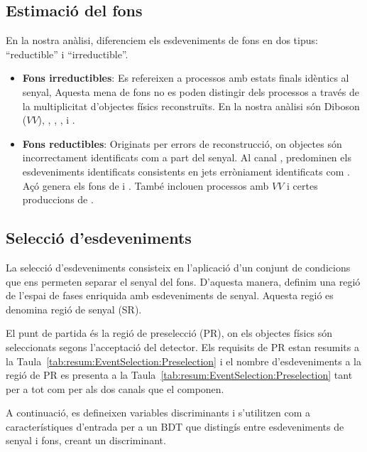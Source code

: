 \subsection{Estimació del fons}
\label{chap:resumen_val:tHq:Fons}
En la nostra anàlisi, diferenciem els esdeveniments de fons en dos tipus: ``reductible'' i ``irreductible''.
\begin{itemize}
	\item \textbf{Fons irreductibles}: Es refereixen a processos amb estats finals idèntics al senyal,
	Aquesta mena de fons no es poden distingir dels processos \tHq a través de la multiplicitat d'objectes físics reconstruïts.
	En la nostra anàlisi són Diboson ($VV$), \tW, \ttZ, \ttH, \ttW i \tZq.
	\item \textbf{Fons reductibles}: Originats per errors de reconstrucció, on objectes són incorrectament identificats
	com a part del senyal. Al canal \dileptau, predominen els esdeveniments identificats consistents en
	jets erròniament identificats com \tauhad. Açó genera els fons de \ttbar i \Zjets. També inclouen processos amb $VV$ i certes produccions de \ttX.
\end{itemize}



\FloatBarrier
\subsection{Selecció d’esdeveniments}
\label{chap:resumen_val:tHq:Seleccio}
La selecció d'esdeveniments consisteix en l'aplicació d'un conjunt de condicions que ens 
permeten separar el senyal del fons. D'aquesta manera, definim una regió de l'espai de 
fases enriquida amb esdeveniments de senyal. Aquesta regió es denomina regió de senyal (SR).

El punt de partida és la regió de preselecció (PR), on els objectes físics són seleccionats 
segons l'acceptació del detector. Els requisits de PR estan resumits a la Taula~\ref{tab:resum:EventSelection:Preselection} 
i el nombre d'esdeveniments a la regió de PR es presenta a la Taula~\ref{tab:resum:EventSelection:Preselection}
tant per a tot \dileptau com per als dos canals que el componen.

A continuació, es defineixen variables discriminants i s'utilitzen
com a característiques d'entrada per a un BDT que distingís entre esdeveniments de senyal i 
fons, creant un discriminant.


